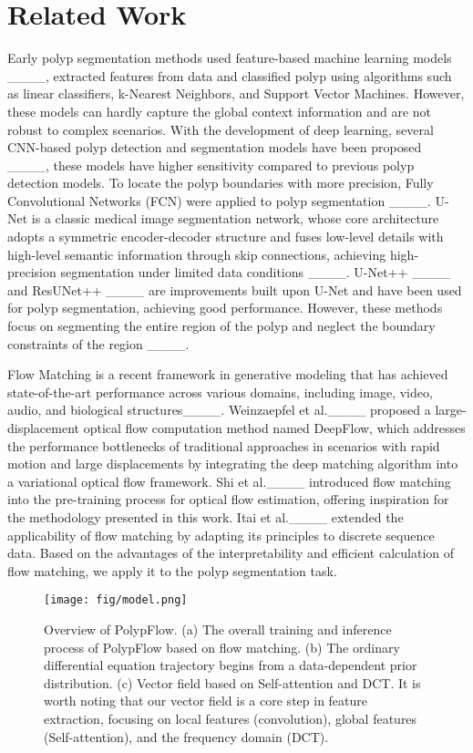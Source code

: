 \section{Related Work}
Early polyp segmentation methods used feature-based machine learning models ____, extracted features from data and classified polyp using algorithms such as linear classifiers, k-Nearest Neighbors, and Support Vector Machines. 
However, these models can hardly capture the global context information and are not robust to complex scenarios. 
With the development of deep learning, several CNN-based polyp detection and segmentation models have been proposed ____, these models have higher sensitivity compared to previous polyp detection models.
To locate the polyp boundaries with more precision, Fully Convolutional Networks (FCN) were applied to polyp segmentation ____. 
U-Net is a classic medical image segmentation network, whose core architecture adopts a symmetric encoder-decoder structure and fuses low-level details with high-level semantic information through skip connections, achieving high-precision segmentation under limited data conditions ____.
U-Net++ ____ and ResUNet++ ____ are improvements built upon U-Net and have been used for polyp segmentation, achieving good performance. 
However, these methods focus on segmenting the entire region of the polyp and neglect the boundary constraints of the region ____.

Flow Matching is a recent framework in generative modeling that has achieved state-of-the-art performance across various domains, including image, video, audio, and biological structures____. Weinzaepfel et al.____ proposed a large-displacement optical flow computation method named DeepFlow, which addresses the performance bottlenecks of traditional approaches in scenarios with rapid motion and large displacements by integrating the deep matching algorithm into a variational optical flow framework. Shi et al.____ introduced flow matching into the pre-training process for optical flow estimation, offering inspiration for the methodology presented in this work. Itai et al.____ extended the applicability of flow matching by adapting its principles to discrete sequence data. Based on the advantages of the interpretability and efficient calculation of flow matching, we apply it to the polyp segmentation task. 

\begin{figure}[t]
    \centering
    \texttt{[image: fig/model.png]}
    \caption{Overview of PolypFlow. (a) The overall training and inference process of PolypFlow based on flow matching. (b) The ordinary differential equation trajectory begins from a data-dependent prior distribution. (c) Vector field based on Self-attention and DCT. It is worth noting that our vector field is a core step in feature extraction, focusing on local features (convolution), global features (Self-attention), and the frequency domain (DCT).}
    \label{fig:model}
\end{figure}